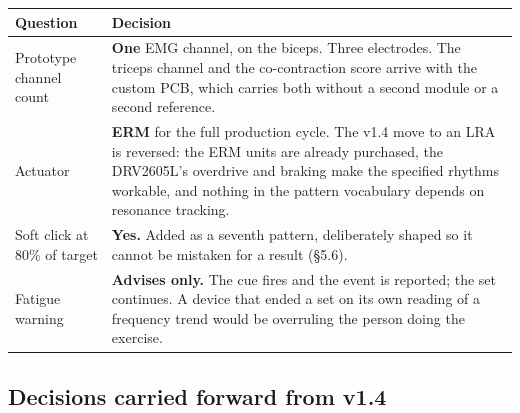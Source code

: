 \documentclass[11pt]{article}
\begin{document}
\begin{table}[H]
\centering\small
\begin{tabularx}{\linewidth}{@{}p{30mm} X@{}}
\toprule
\textbf{Question} & \textbf{Decision} \\
\midrule
Prototype channel count & \textbf{One} EMG channel, on the biceps. Three electrodes. The triceps channel and the co-contraction score arrive with the custom PCB, which carries both without a second module or a second reference. \\[3pt]
Actuator & \textbf{ERM} for the full production cycle. The v1.4 move to an LRA is reversed: the ERM units are already purchased, the DRV2605L's overdrive and braking make the specified rhythms workable, and nothing in the pattern vocabulary depends on resonance tracking. \\[3pt]
Soft click at 80\% of target & \textbf{Yes.} Added as a seventh pattern, deliberately shaped so it cannot be mistaken for a result (\S5.6). \\[3pt]
Fatigue warning & \textbf{Advises only.} The cue fires and the event is reported; the set continues. A device that ended a set on its own reading of a frequency trend would be overruling the person doing the exercise. \\
\bottomrule
\end{tabularx}
\end{table}

\subsection{Decisions carried forward from v1.4}
\end{document}
